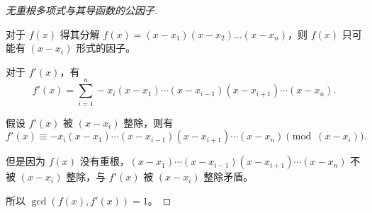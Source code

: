 \begin{proof}[无重根多项式与其导函数的公因子]~

	对于 $f(x)$ 得其分解 $f(x) = (x - x_1) (x - x_2) \dots (x - x_n)$，则 $f(x)$ 只可能有 $(x - x_i)$ 形式的因子。

	对于 $f'(x)$，有
	$$
	f'(x) = \sum_{i=1}^{n} -x_i (x - x_1) \cdots (x - x_{i - 1}) (x - x_{i + 1}) \cdots (x - x_n).
	$$

	假设 $f'(x)$ 被 $(x - x_i)$ 整除，则有
	$$
	f'(x) \equiv -x_i(x - x_1) \cdots (x - x_{i - 1}) (x - x_{i + 1}) \cdots (x - x_n) \pmod{(x - x_i)}.
	$$

	但是因为 $f(x)$ 没有重根，$(x - x_1) \cdots (x - x_{i - 1}) (x - x_{i + 1}) \cdots (x - x_n)$ 不被 $(x - x_i)$ 整除，与 $f'(x)$ 被 $(x - x_i)$ 整除矛盾。

	所以 $\gcd(f(x), f'(x)) = 1$。
	\qedhere

	
\end{proof}
